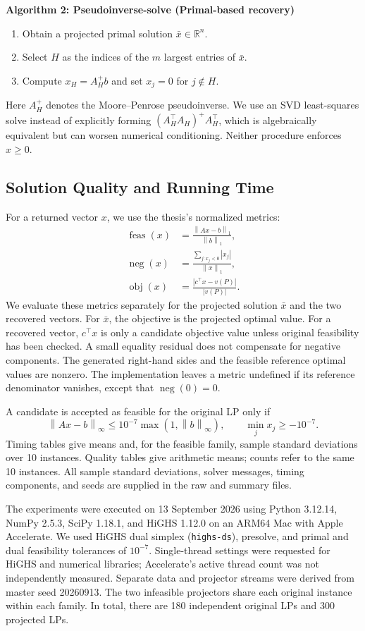 \documentclass[12pt,letterpaper,oneside]{report}
\theoremstyle{definition}
\newcommand{\R}{\mathbb{R}}
\newcommand{\norm}[1]{\left\lVert #1\right\rVert}
\newcommand{\feas}{\operatorname{feas}}
\newcommand{\negmass}{\operatorname{neg}}
\newcommand{\obj}{\operatorname{obj}}
\begin{document}
\noindent\textbf{Algorithm 2: Pseudoinverse-solve (Primal-based recovery)}
\begin{enumerate}[label=\arabic*:,nosep]
\item Obtain a projected primal solution $\bar x\in\R^n$.
\item Select $H$ as the indices of the $m$ largest entries of $\bar x$.
\item Compute $x_H=A_H^+b$ and set $x_j=0$ for $j\notin H$.
\end{enumerate}
Here $A_H^+$ denotes the Moore--Penrose pseudoinverse. We use an SVD
least-squares solve instead of explicitly forming
$(A_H^\top A_H)^+A_H^\top$, which is algebraically equivalent but can
worsen numerical conditioning. Neither procedure enforces $x\geq0$.

\subsection{Solution Quality and Running Time}
For a returned vector $x$, we use the thesis's normalized metrics:
\begin{align*}
\feas(x)&=\frac{\norm{Ax-b}_1}{\norm{b}_1},\\
\negmass(x)&=\frac{\sum_{j:x_j<0}|x_j|}
{\norm{x}_1},\\
\obj(x)&=\frac{|c^\top x-v(P)|}{|v(P)|}.
\end{align*}
We evaluate these metrics separately for the projected solution $\bar x$
and the two recovered vectors. For $\bar x$, the objective is the
projected optimal value. For a recovered vector, $c^\top x$ is only a
candidate objective value unless original feasibility has been checked.
A small equality residual does not compensate for negative components.
The generated right-hand sides and the feasible reference optimal values
are nonzero. The implementation leaves a metric undefined if its
reference denominator vanishes, except that $\negmass(0)=0$.

A candidate is accepted as feasible for the original LP only if
\[
\norm{Ax-b}_\infty\leq 10^{-7}\max(1,\norm b_\infty),
\qquad \min_j x_j\geq-10^{-7}.
\]
Timing tables give means and, for the feasible family, sample standard
deviations over 10 instances. Quality tables give arithmetic means;
counts refer to the same 10 instances. All sample standard deviations,
solver messages, timing components, and seeds are supplied in the raw
and summary files.

The experiments were executed on 13 September 2026 using Python 3.12.14,
NumPy 2.5.3, SciPy 1.18.1, and HiGHS 1.12.0 on an ARM64 Mac with
Apple Accelerate. We used HiGHS dual simplex (\texttt{highs-ds}),
presolve, and primal and dual feasibility tolerances of $10^{-7}$.
Single-thread settings were requested for HiGHS and numerical libraries;
Accelerate's active thread count was not independently measured.
Separate data and projector streams were derived from master seed
20260913. The two infeasible projectors share each original instance
within each family. In total, there are 180 independent original LPs
and 300 projected LPs.
\end{document}
